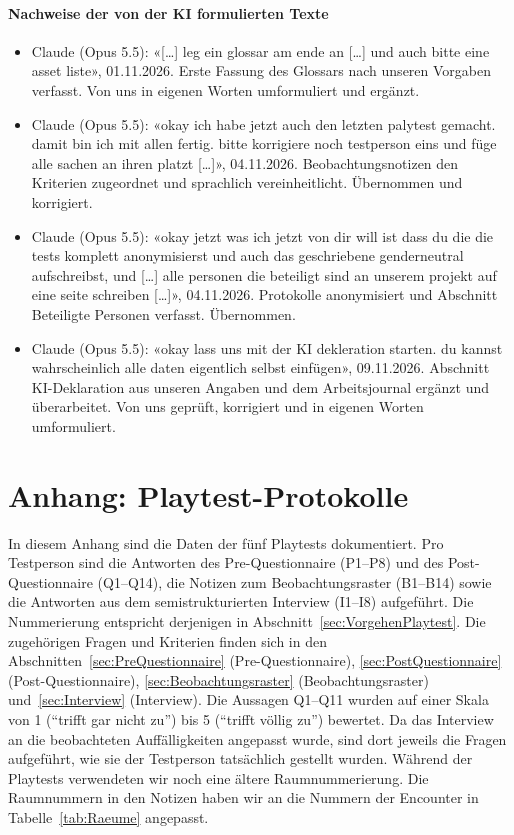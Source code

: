 \documentclass[../Main.tex]{subfiles}
\begin{document}
\paragraph{Nachweise der von der KI formulierten Texte}
\begin{itemize}[leftmargin=1.5cm, itemsep=0.4em]
    \item Claude (Opus 5.5): «[\ldots] leg ein glossar am ende an [\ldots] und auch bitte eine asset liste», 01.11.2026. Erste Fassung des Glossars nach unseren Vorgaben verfasst. Von uns in eigenen Worten umformuliert und ergänzt.
    \item Claude (Opus 5.5): «okay ich habe jetzt auch den letzten palytest gemacht. damit bin ich mit allen fertig. bitte korrigiere noch testperson eins und füge alle sachen an ihren platzt [\ldots]», 04.11.2026. Beobachtungsnotizen den Kriterien zugeordnet und sprachlich vereinheitlicht. Übernommen und korrigiert.
    \item Claude (Opus 5.5): «okay jetzt was ich jetzt von dir will ist dass du die die tests komplett anonymisierst und auch das geschriebene genderneutral aufschreibst, und [\ldots] alle personen die beteiligt sind an unserem projekt auf eine seite schreiben [\ldots]», 04.11.2026. Protokolle anonymisiert und Abschnitt Beteiligte Personen verfasst. Übernommen.
    \item Claude (Opus 5.5): «okay lass uns mit der KI dekleration starten. du kannst wahrscheinlich alle daten eigentlich selbst einfügen», 09.11.2026. Abschnitt KI-Deklaration aus unseren Angaben und dem Arbeitsjournal ergänzt und überarbeitet. Von uns geprüft, korrigiert und in eigenen Worten umformuliert.
\end{itemize}

\newpage
{}
\section{Anhang: Playtest-Protokolle} \label{sec:PlaytestProtokolle}

In diesem Anhang sind die Daten der fünf Playtests dokumentiert. Pro Testperson sind die Antworten des Pre-Questionnaire (P1--P8) und des Post-Questionnaire (Q1--Q14), die Notizen zum Beobachtungsraster (B1--B14) sowie die Antworten aus dem semistrukturierten Interview (I1--I8) aufgeführt. Die Nummerierung entspricht derjenigen in Abschnitt~\ref{sec:VorgehenPlaytest}. Die zugehörigen Fragen und Kriterien finden sich in den Abschnitten~\ref{sec:PreQuestionnaire} (Pre-Questionnaire), \ref{sec:PostQuestionnaire} (Post-Questionnaire), \ref{sec:Beobachtungsraster} (Beobachtungsraster) und~\ref{sec:Interview} (Interview). Die Aussagen Q1--Q11 wurden auf einer Skala von 1 (\enquote{trifft gar nicht zu}) bis 5 (\enquote{trifft völlig zu}) bewertet. Da das Interview an die beobachteten Auffälligkeiten angepasst wurde, sind dort jeweils die Fragen aufgeführt, wie sie der Testperson tatsächlich gestellt wurden. Während der Playtests verwendeten wir noch eine ältere Raumnummerierung. Die Raumnummern in den Notizen haben wir an die Nummern der Encounter in Tabelle~\ref{tab:Raeume} angepasst.
\end{document}
